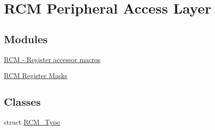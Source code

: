 \hypertarget{group__RCM__Peripheral__Access__Layer}{}\section{R\+CM Peripheral Access Layer}
\label{group__RCM__Peripheral__Access__Layer}
\subsection*{Modules}
\begin{DoxyCompactItemize}
\item 
\hyperlink{group__RCM__Register__Accessor__Macros}{R\+C\+M -\/ Register accessor macros}
\item 
\hyperlink{group__RCM__Register__Masks}{R\+C\+M Register Masks}
\end{DoxyCompactItemize}
\subsection*{Classes}
\begin{DoxyCompactItemize}
\item 
struct \hyperlink{structRCM__Type}{R\+C\+M\+\_\+\+Type}
\end{DoxyCompactItemize}

